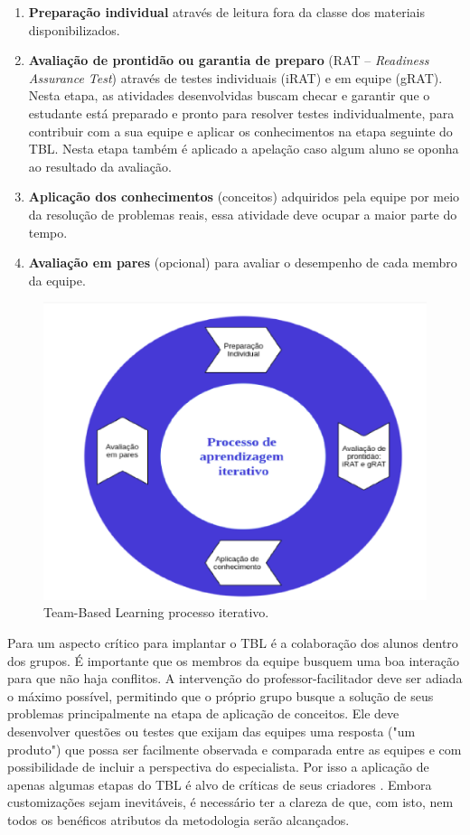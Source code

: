 \begin{enumerate}
  \item \textbf{Preparação individual} através de leitura fora da classe dos materiais disponibilizados.
  \item \textbf{Avaliação de prontidão ou garantia de preparo} (RAT – \textit{Readiness Assurance Test}) através de testes individuais  (iRAT) e em equipe (gRAT). Nesta etapa, as atividades desenvolvidas buscam checar e garantir que o estudante está preparado e pronto para resolver testes individualmente, para contribuir com a sua equipe e aplicar os conhecimentos na etapa seguinte do TBL. Nesta etapa também é aplicado a apelação caso algum aluno se oponha ao resultado da avaliação.
  \item \textbf{Aplicação dos conhecimentos} (conceitos) adquiridos pela equipe por meio da resolução de problemas reais, essa atividade deve ocupar a maior parte do tempo.
  \item \textbf{Avaliação em pares} (opcional) para avaliar o desempenho de cada membro da equipe.
\end{enumerate}

\begin{figure}[h!]
	\centering
  \includegraphics[keepaspectratio=true,scale=0.5]{figuras/tbl1.eps}
  \caption{Team-Based Learning processo iterativo.}
	\label{fig:tbl1}
\end{figure}

Para \cite{bollela} um aspecto crítico para implantar o TBL é a colaboração dos alunos dentro dos grupos. É importante que os membros da equipe busquem uma boa interação para que não haja conflitos. A intervenção do professor-facilitador deve ser adiada o máximo possível, permitindo que o próprio grupo busque a solução de seus problemas principalmente na etapa de aplicação de conceitos. Ele deve desenvolver questões ou testes que exijam das equipes uma resposta ("um produto") que possa ser facilmente observada e comparada entre as equipes e com possibilidade de incluir a perspectiva do especialista. Por isso a aplicação de apenas algumas etapas do TBL é alvo de críticas de seus criadores \cite{sweet}. Embora customizações sejam inevitáveis, é necessário ter a clareza de que, com isto, nem todos os benéficos atributos da metodologia serão alcançados.

